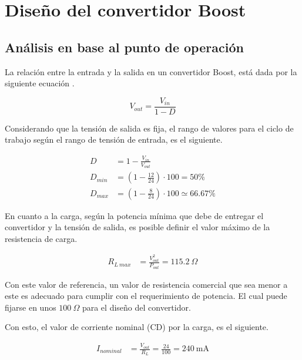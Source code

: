 \documentclass[conference]{IEEEtran}
\begin{document}
\section{Diseño del convertidor Boost}

\subsection{Análisis en base al punto de operación}
La relación entre la entrada y la salida en un convertidor Boost, está dada
por la siguiente ecuación \cite{hart2011power}.

\begin{equation}
    V_{out} = \frac{V_{in}}{1 - D}
    \label{eq:boost_relation}
\end{equation}

Considerando que la tensión de salida es fija, el rango de valores para el ciclo de 
trabajo según el rango de tensión de entrada, es el siguiente.


\begin{equation}
\begin{aligned}
D &= 1 - \frac{V_{in}}{V_{out}} \\
    D_{min} &= \left( 1 - \frac{12}{24} \right) \cdot 100 = 50\% \\
    D_{max} &= \left( 1 - \frac{8}{24} \right) \cdot 100 \simeq 66.67\%
\end{aligned}
\label{eq:rango_D}
\end{equation}

En cuanto a la carga, según la potencia mínima que debe de entregar el convertidor 
y la tensión de salida, es posible definir el valor máximo de la resistencia de carga.

\begin{equation}
\begin{aligned}
    R_{L~max} &= \frac{V_{out}^2}{P_{out}} = 115.2~\Omega
\end{aligned}
\label{eq:max_RL}
\end{equation}

Con este valor de referencia, un valor de resistencia comercial que sea menor a este
es adecuado para cumplir con el requerimiento de potencia. El cual puede fijarse
en unos $100~\Omega$ para el diseño del convertidor.

Con esto, el valor de corriente nominal (CD) por la carga, es el siguiente. 

\begin{equation}
\begin{aligned}
    I_{nominal} &= \frac{V_{out}}{R_{L}} = \frac{24}{100} = 240~\mathrm{mA}
\end{aligned}
\label{eq:corriente_nominal}
\end{equation}
\end{document}
